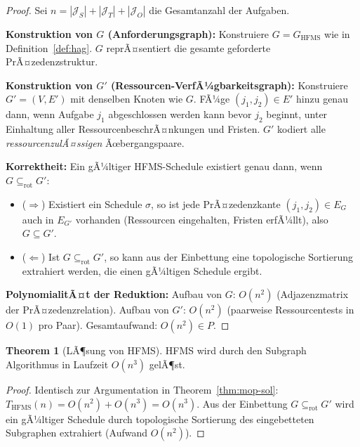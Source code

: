 ﻿\documentclass[a4paper,12pt]{article}
\theoremstyle{definition}
\newtheorem{theorem}{Theorem}[section]
\begin{document}
\begin{proof}
Sei $n = |\mathcal{J}_S| + |\mathcal{J}_T| + |\mathcal{J}_O|$ die Gesamtanzahl der Aufgaben.

\textbf{Konstruktion von $G$ (Anforderungsgraph):}
Konstruiere $G = G_{\mathrm{HFMS}}$ wie in Definition~\ref{def:hag}.
$G$ reprÃ¤sentiert die gesamte geforderte PrÃ¤zedenzstruktur.

\textbf{Konstruktion von $G'$ (Ressourcen-VerfÃ¼gbarkeitsgraph):}
Konstruiere $G' = (V, E')$ mit denselben Knoten wie $G$.
FÃ¼ge $(j_1, j_2) \in E'$ hinzu genau dann, wenn Aufgabe $j_1$ abgeschlossen
werden kann bevor $j_2$ beginnt, unter Einhaltung aller RessourcenbeschrÃ¤nkungen
und Fristen.
$G'$ kodiert alle \emph{ressourcenzulÃ¤ssigen} Ãœbergangspaare.

\textbf{Korrektheit:}
Ein gÃ¼ltiger HFMS-Schedule existiert genau dann, wenn $G \subseteq_{\mathrm{rot}} G'$:
\begin{itemize}
    \item ($\Rightarrow$) Existiert ein Schedule $\sigma$, so ist jede PrÃ¤zedenzkante
          $(j_1, j_2) \in E_G$ auch in $E_{G'}$ vorhanden (Ressourcen eingehalten,
          Fristen erfÃ¼llt), also $G \subseteq G'$.
    \item ($\Leftarrow$) Ist $G \subseteq_{\mathrm{rot}} G'$, so kann aus der Einbettung
          eine topologische Sortierung extrahiert werden, die einen gÃ¼ltigen Schedule ergibt.
\end{itemize}

\textbf{PolynomialitÃ¤t der Reduktion:}
Aufbau von $G$: $O(n^2)$ (Adjazenzmatrix der PrÃ¤ze\-denzrelation).
Aufbau von $G'$: $O(n^2)$ (paarweise Ressourcentests in $O(1)$ pro Paar).
Gesamtaufwand: $O(n^2) \in P$.
\end{proof}

\begin{theorem}[LÃ¶sung von HFMS]
\label{thm:hfms-sol}
HFMS wird durch den Subgraph Algorithmus in Laufzeit $O(n^3)$ gelÃ¶st.
\end{theorem}

\begin{proof}
Identisch zur Argumentation in Theorem~\ref{thm:mop-sol}:
$T_{\mathrm{HFMS}}(n) = O(n^2) + O(n^3) = O(n^3)$.
Aus der Einbettung $G \subseteq_{\mathrm{rot}} G'$ wird ein gÃ¼ltiger Schedule
durch topologische Sortierung des eingebetteten Subgraphen extrahiert (Aufwand $O(n^2)$).
\end{proof}

\end{document}
